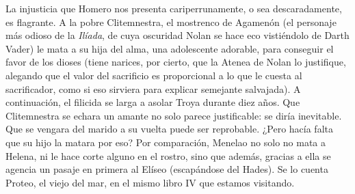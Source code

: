 
La injusticia que Homero nos presenta cariperrunamente, o sea descaradamente, es flagrante. A la pobre Clitemnestra, el mostrenco de Agamenón (el personaje más odioso de la \emph{Ilíada}, de cuya oscuridad Nolan se hace eco vistiéndolo de Darth Vader) le mata a su hija del alma, una adolescente adorable, para conseguir el favor de los dioses (tiene narices, por cierto, que la Atenea de Nolan lo justifique, alegando que el valor del sacrificio es proporcional a lo que le cuesta al sacrificador, como si eso sirviera para explicar semejante salvajada). A continuación, el filicida se larga a asolar Troya durante diez años. Que Clitemnestra se echara un amante no solo parece justificable: se diría inevitable. Que se vengara del marido a su vuelta puede ser reprobable. ¿Pero hacía falta que su hijo la matara por eso? Por comparación, Menelao no solo no mata a Helena, ni le hace corte alguno en el rostro, sino que además, gracias a ella se agencia un pasaje en primera al Elíseo (escapándose del Hades). Se lo cuenta Proteo, el viejo del mar, en el mismo libro IV que estamos visitando.
